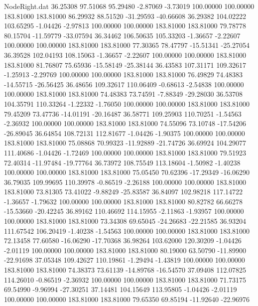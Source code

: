 \begin{filecontents}{NodeRight.dat}
  36.25308   97.51068   95.29480    -2.87069   -3.73019  100.00000  100.00000  183.81000  183.81000   86.29932   88.51520  -31.29593  -40.66608
  36.29382  104.02222  103.65295    -1.04426   -2.97813  100.00000  100.00000  183.81000  183.81000   79.78778   80.15704  -11.59779  -33.07594
  36.34462  106.50635  105.33203    -1.36657   -2.22607  100.00000  100.00000  183.81000  183.81000   77.30365   78.47797  -15.51341  -25.27054
  36.39528  102.04193  108.15063    -1.36657   -2.22607  100.00000  100.00000  183.81000  183.81000   81.76807   75.65936  -15.58149  -25.38144
  36.43583  107.31171  109.32617    -1.25913   -2.29769  100.00000  100.00000  183.81000  183.81000   76.49829   74.48383  -14.55715  -26.56425
  36.48656  109.32617  110.06409    -0.68613   -2.54838  100.00000  100.00000  183.81000  183.81000   74.48383   73.74591   -7.88349  -29.28030
  36.53708  104.35791  110.33264    -1.22332   -1.76050  100.00000  100.00000  183.81000  183.81000   79.45209   73.47736  -14.01191  -20.16487
  36.58771  109.25903  110.70251    -1.54563   -2.36932  100.00000  100.00000  183.81000  183.81000   74.55096   73.10748  -17.54206  -26.89045
  36.64854  108.72131  112.81677    -1.04426   -1.90375  100.00000  100.00000  183.81000  183.81000   75.08868   70.99323  -11.92889  -21.74726
  36.69924  104.29077  111.40686    -1.04426   -1.72469  100.00000  100.00000  183.81000  183.81000   79.51923   72.40314  -11.97484  -19.77764
  36.73972  108.75549  113.18604    -1.50982   -1.40238  100.00000  100.00000  183.81000  183.81000   75.05450   70.62396  -17.29349  -16.06290
  36.79035  109.99695  110.39978    -0.86519   -2.26188  100.00000  100.00000  183.81000  183.81000   73.81305   73.41022   -9.88249  -25.83587
  36.84097  102.98218  117.14722    -1.36657   -1.79632  100.00000  100.00000  183.81000  183.81000   80.82782   66.66278  -15.53660  -20.42245
  36.89162  110.46692  114.15955    -2.11863   -1.93957  100.00000  100.00000  183.81000  183.81000   73.34308   69.65045  -24.26683  -22.21585
  36.93204  111.67542  106.20419    -1.40238   -1.54563  100.00000  100.00000  183.81000  183.81000   72.13458   77.60580  -16.06290  -17.70368
  36.98264  103.62000  120.30209    -1.04426   -2.01119  100.00000  100.00000  183.81000  183.81000   80.19000   63.50790  -11.89900  -22.91698
  37.05348  109.42627  110.19861    -1.29494   -1.43819  100.00000  100.00000  183.81000  183.81000   74.38373   73.61139  -14.89768  -16.54570
  37.09408  112.07825  114.26010    -0.86519   -2.36932  100.00000  100.00000  183.81000  183.81000   71.73175   69.54990   -9.96994  -27.30251
  37.14481  104.15649  113.95805    -1.04426   -2.01119  100.00000  100.00000  183.81000  183.81000   79.65350   69.85194  -11.92640  -22.96976

\end{filecontents}
